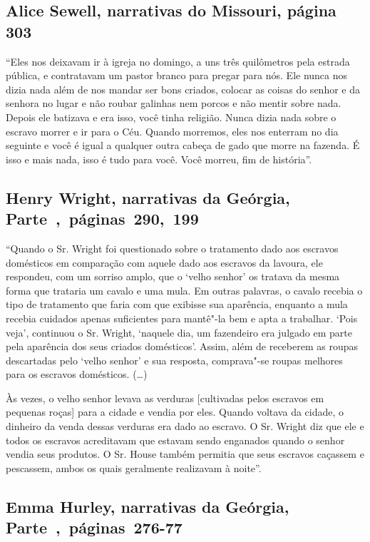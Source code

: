 \subsection{Alice Sewell, narrativas do Missouri, página 303}
\label{ref236}

``Eles nos deixavam ir à igreja no domingo, a uns três quilômetros pela
estrada pública, e contratavam um pastor branco para pregar para nós.
Ele nunca nos dizia nada além de nos mandar ser bons criados, colocar as
coisas do senhor e da senhora no lugar e não roubar galinhas nem porcos
e não mentir sobre nada. Depois ele batizava e era isso, você tinha
religião. Nunca dizia nada sobre o escravo morrer e ir para o Céu.
Quando morremos, eles nos enterram no dia seguinte e você é igual a
qualquer outra cabeça de gado que morre na fazenda. É isso e mais nada,
isso é tudo para você. Você morreu, fim de história''.

\subsection{Henry Wright, narrativas da Geórgia, Parte~,~páginas~290,~199}
\label{ref319}

``Quando o Sr. Wright foi questionado sobre o tratamento dado aos
escravos domésticos em comparação com aquele dado aos escravos da
lavoura, ele respondeu, com um sorriso amplo, que o `velho senhor' os
tratava da mesma forma que trataria um cavalo e uma mula. Em outras
palavras, o cavalo recebia o tipo de tratamento que faria com que
exibisse sua aparência, enquanto a mula recebia cuidados apenas
suficientes para mantê"-la bem e apta a trabalhar. `Pois veja', continuou
o Sr. Wright, `naquele dia, um fazendeiro era julgado em parte pela
aparência dos seus criados domésticos'. Assim, além de receberem as
roupas descartadas pelo `velho senhor' e sua resposta, comprava"-se
roupas melhores para os escravos domésticos. (\ldots{})

Às vezes, o velho senhor levava as verduras {[}cultivadas pelos escravos
em pequenas roças{]} para a cidade e vendia por eles. Quando voltava da
cidade, o dinheiro da venda dessas verduras era dado ao escravo. O Sr.
Wright diz que ele e todos os escravos acreditavam que estavam sendo
enganados quando o senhor vendia seus produtos. O Sr. House também
permitia que seus escravos caçassem e pescassem, ambos os quais
geralmente realizavam à noite''.

\subsection{Emma Hurley, narrativas da Geórgia, Parte~,~páginas~276-77}
\label{ref159}

